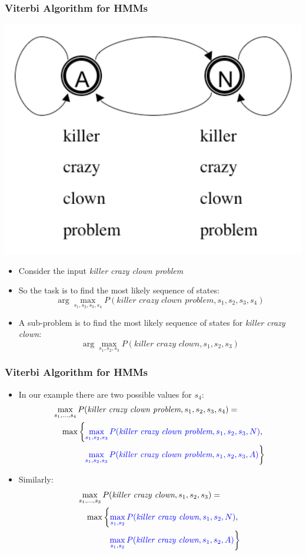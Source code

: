 \begin{frame}
\frametitle{Viterbi Algorithm for HMMs}
\begin{center}
\includegraphics[scale=.3]{figures/hmmfig}
\end{center}
\begin{itemize}[<+->]
\item Consider the input {\it killer crazy clown problem}
\item So the task is to find the most likely sequence of states:
\[ \arg\max_{s_1, s_2, s_3, s_4} P(\textit{killer crazy clown problem}, s_1, s_2, s_3, s_4) \]
\item A sub-problem is to find the most likely sequence of states for {\it killer crazy clown}:
\[ \arg\max_{s_1, s_2, s_3} P(\textit{killer crazy clown}, s_1, s_2, s_3) \]
\end{itemize}
\end{frame}

\begin{frame}
\frametitle{Viterbi Algorithm for HMMs}
\begin{itemize}[<+->]
\item In our example there are two possible values for $s_4$:
\begin{eqnarray*}
\lefteqn{\max_{s_1, \ldots, s_4} P(\textit{killer crazy clown problem}, s_1, s_2, s_3, s_4) =} \\
&& \max \left\{ {\color{blue} \max_{s_1, s_2, s_3} P(\textit{killer crazy clown problem}, s_1, s_2, s_3, N) }, \right. \\
&&  \left. {\color{blue} \max_{s_1, s_2, s_3} P(\textit{killer crazy clown problem}, s_1, s_2, s_3, A) } \right\}
\end{eqnarray*}
\item Similarly:
\begin{eqnarray*}
\lefteqn{\max_{s_1, \ldots, s_3} P(\textit{killer crazy clown}, s_1, s_2, s_3) =} \\
&& \max \left\{ {\color{blue} \max_{s_1, s_2} P(\textit{killer crazy clown}, s_1, s_2, N) }, \right. \\
&&  \left. {\color{blue} \max_{s_1, s_2} P(\textit{killer crazy clown}, s_1, s_2, A) } \right\}
\end{eqnarray*}
\end{itemize}
\end{frame}

